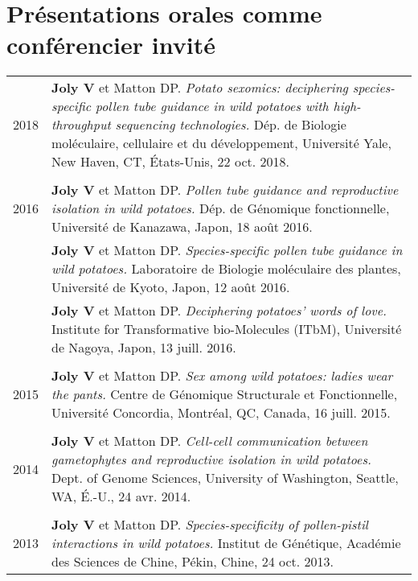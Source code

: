 \documentclass[letterpaper,12pt]{article}
\begin{document}
\vspace{6mm}

\section[Conférencier invité]{Présentations orales
                              \small comme conférencier invité}

\begin{tabularx}{\textwidth}{@{}r|X@{}}

2018
& \textbf{Joly V} et Matton DP.
  \emph{Potato sexomics: deciphering species-specific pollen tube guidance in
  wild potatoes with high-throughput sequencing technologies.}
  Dép. de Biologie moléculaire, cellulaire et du développement,
  Université Yale, New Haven, CT, États-Unis, 22 oct. 2018.
  \\

\multicolumn{2}{c}{} \\

2016
& \textbf{Joly V} et Matton DP.
  \emph{Pollen tube guidance and reproductive isolation in wild potatoes.}
  Dép. de Génomique fonctionnelle,
  Université de Kanazawa, Japon, 18 août 2016.
  \vspace{1.5mm} \\

& \textbf{Joly V} et Matton DP.
  \emph{Species-specific pollen tube guidance in wild potatoes.}
  Laboratoire de Biologie moléculaire des plantes,
  Université de Kyoto, Japon, 12 août 2016.
  \vspace{1.5mm} \\

& \textbf{Joly V} et Matton DP.
  \emph{Deciphering potatoes’ words of love.}
  Institute for Transformative bio-Molecules (ITbM),
  Université de Nagoya, Japon, 13 juill. 2016.
  \\

\multicolumn{2}{c}{} \\

2015
& \textbf{Joly V} et Matton DP.
  \emph{Sex among wild potatoes: ladies wear the pants.}
  Centre de Génomique Structurale et Fonctionnelle, Université Concordia,
  Montréal, QC, Canada, 16 juill. 2015.
  \\

\multicolumn{2}{c}{} \\

2014
& \textbf{Joly V} et Matton DP.
  \emph{Cell-cell communication between gametophytes and reproductive
  isolation in wild potatoes.}
  Dept. of Genome Sciences, University of Washington,
  Seattle, WA, É.-U., 24 avr. 2014.
  \\

\multicolumn{2}{c}{} \\

2013
& \textbf{Joly V} et Matton DP.
  \emph{Species-specificity of pollen-pistil interactions in wild potatoes.}
  Institut de Génétique, Académie des Sciences de Chine,
  Pékin, Chine, 24 oct. 2013. \\

\end{tabularx}
\end{document}
